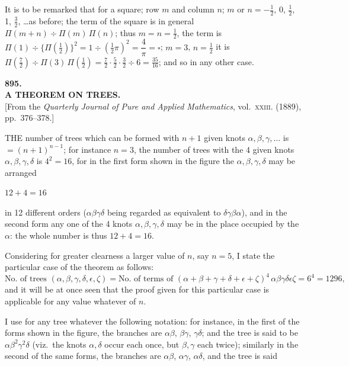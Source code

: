 \documentclass[11pt,a4paper]{article}
\begin{document}
\smallskip
It is to be remarked that for a square; row $m$ and column $n$; $m$ or $n = -\tfrac{1}{2}$, 0, $\tfrac{1}{2}$, 1, $\tfrac{3}{2}$, \ldots as before; the term of the square is in general $\Pi(m + n) \div \Pi(m)\,\Pi(n)$; thus $m = n = \tfrac{1}{2}$, the term is $\Pi(1) \div \{\Pi(\tfrac{1}{2})\}^2 = 1 \div (\tfrac{1}{2}\pi)^2 = \dfrac{4}{\pi} = \square$; $m = 3$, $n = \tfrac{1}{2}$ it is $\Pi(\tfrac{7}{2}) \div \Pi(3)\,\Pi(\tfrac{1}{2}) = \tfrac{7}{2}\cdot\tfrac{5}{2}\cdot\tfrac{3}{2}\div 6 = \tfrac{35}{16}$; and so in any other case.

\bigskip

\clearpage
\begin{center}
{\large\bfseries 895.}\\[0.5em]
{\large\bfseries A THEOREM ON TREES.}\\[0.5em]
\small [From the \emph{Quarterly Journal of Pure and Applied Mathematics}, vol.\ \textsc{xxiii}. (1889), pp.\ 376--378.]
\end{center}
\medskip

THE number of trees which can be formed with $n + 1$ given knots $\alpha, \beta, \gamma, \ldots$ is $= (n + 1)^{n-1}$; for instance $n = 3$, the number of trees with the 4 given knots $\alpha, \beta, \gamma, \delta$ is $4^2 = 16$, for in the first form shown in the figure the $\alpha, \beta, \gamma, \delta$ may be arranged
\begin{center}
$12 + 4 = 16$
\end{center}
in 12 different orders ($\alpha\beta\gamma\delta$ being regarded as equivalent to $\delta\gamma\beta\alpha$), and in the second form any one of the 4 knots $\alpha, \beta, \gamma, \delta$ may be in the place occupied by the $\alpha$: the whole number is thus $12 + 4 = 16$.

\smallskip
Considering for greater clearness a larger value of $n$, say $n = 5$, I state the particular case of the theorem as follows:
\[
\text{No.\ of trees }(\alpha, \beta, \gamma, \delta, \epsilon, \zeta) = \text{No.\ of terms of }(\alpha + \beta + \gamma + \delta + \epsilon + \zeta)^4\,\alpha\beta\gamma\delta\epsilon\zeta = 6^4 = 1296,
\]
and it will be at once seen that the proof given for this particular case is applicable for any value whatever of $n$.

\smallskip
I use for any tree whatever the following notation: for instance, in the first of the forms shown in the figure, the branches are $\alpha\beta$, $\beta\gamma$, $\gamma\delta$; and the tree is said to be $\alpha\beta^2\gamma^2\delta$ (viz.\ the knots $\alpha, \delta$ occur each once, but $\beta, \gamma$ each twice); similarly in the second of the same forms, the branches are $\alpha\beta$, $\alpha\gamma$, $\alpha\delta$, and the tree is said
\end{document}
